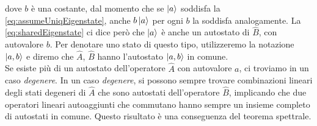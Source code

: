 dove $b$ \`e una costante, dal momento che se $\ket{a}$ soddisfa la \eqref{eq:assumeUniqEigenstate}, anche $b \ket{a}$ per ogni $b$ la soddisfa analogamente. La \eqref{eq:sharedEigenstate} ci dice per\`o che $\ket{a}$ \`e anche un autostato di $\hat{B}$, con autovalore $b$. Per denotare uno stato di questo tipo, utilizzeremo la notazione $\ket{a, b}$ e diremo che $\hat{A}$, $\hat{B}$ hanno l'autostato $\ket{a, b}$ in comune. \\

Se esiste pi\`u di un autostato dell'operatore $\hat{A}$ con autovalore $a$, ci troviamo in un caso \textit{degenere}. In un caso \textit{degenere}, si possono sempre trovare combinazioni lineari degli stati degeneri di $\hat{A}$ che sono autostati dell'operatore $\hat{B}$, implicando che due operatori lineari autoaggiunti che commutano hanno sempre un insieme completo di autostati in comune. Questo risultato \`e una conseguenza del teorema spettrale.

